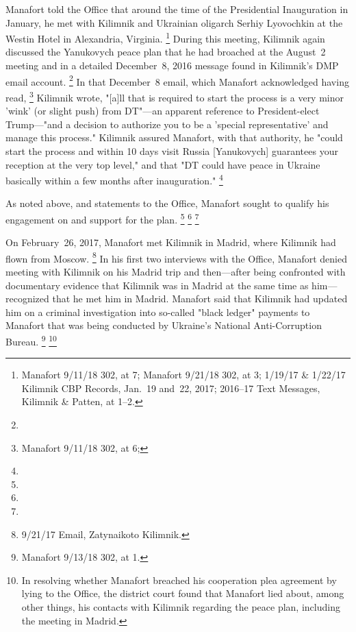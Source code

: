Manafort told the Office that around the time of the Presidential Inauguration in January, he met with Kilimnik and Ukrainian oligarch Serhiy Lyovochkin at the Westin Hotel in Alexandria, Virginia.%
\footnote{ Manafort 9/11/18 302, at 7;
Manafort 9/21/18 302, at 3;
1/19/17 \& 1/22/17 Kilimnik CBP Records, Jan.~19 and~22, 2017;
2016--17 Text Messages, Kilimnik \& Patten, at 1--2.}
During this meeting, Kilimnik again discussed the Yanukovych peace plan that he had broached at the August~2 meeting and in a detailed December~8, 2016 message found in Kilimnik's DMP email account.%
\footnote{}
In that December~8 email, which Manafort acknowledged having read,%
\footnote{Manafort 9/11/18 302, at 6;
}
Kilimnik wrote, "[a]ll that is required to start the process is a very minor 'wink' (or slight push) from DT"---an apparent reference to President-elect Trump---"and a decision to authorize you to be a 'special representative' and manage this process."
Kilimnik assured Manafort, with that authority, he "could start the process and within 10 days visit Russia [Yanukovych] guarantees your reception at the very top level," and that "DT could have peace in Ukraine basically within a few months after inauguration."%
\footnote{}

As noted above,
and statements to the Office, Manafort sought to qualify his engagement on and support for the plan.
\footnote{}
\footnote{}
\footnote{}

On February~26, 2017, Manafort met Kilimnik in Madrid, where Kilimnik had flown from Moscow.%
\footnote{9/21/17 Email, Zatynaikoto Kilimnik.}
In his first two interviews with the Office, Manafort denied meeting with Kilimnik on his Madrid trip and then---after being confronted with documentary evidence that Kilimnik was in Madrid at the same time as him---recognized that he met him in Madrid.
Manafort said that Kilimnik had updated him on a criminal investigation into so-called "black ledger" payments to Manafort that was being conducted by Ukraine's National Anti-Corruption Bureau.%
\footnote{Manafort 9/13/18 302, at 1.}
\footnote{ In resolving whether Manafort breached his cooperation plea agreement by lying to the Office, the district court found that Manafort lied about, among other things, his contacts with Kilimnik regarding the peace plan, including the meeting in Madrid.}

